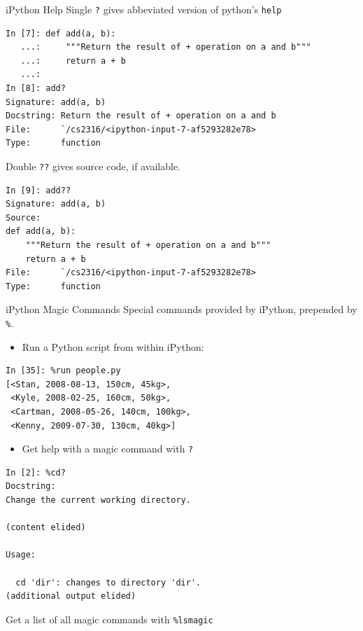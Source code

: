 \documentclass[smaller, aspectratio=1610]{beamer}
\begin{document}
\begin{frame}[label={sec:org6ed3069},fragile]{iPython Help}
 Single \texttt{?} gives abbeviated version of python's \texttt{help}

\lstset{language=sh,label= ,caption= ,captionpos=b,numbers=none}
\begin{lstlisting}
In [7]: def add(a, b):
   ...:     """Return the result of + operation on a and b"""
   ...:     return a + b
   ...:
In [8]: add?
Signature: add(a, b)
Docstring: Return the result of + operation on a and b
File:      `/cs2316/<ipython-input-7-af5293282e78>
Type:      function
\end{lstlisting}

Double \texttt{??} gives source code, if available.

\lstset{language=sh,label= ,caption= ,captionpos=b,numbers=none}
\begin{lstlisting}
In [9]: add??
Signature: add(a, b)
Source:
def add(a, b):
    """Return the result of + operation on a and b"""
    return a + b
File:      `/cs2316/<ipython-input-7-af5293282e78>
Type:      function
\end{lstlisting}
\end{frame}

\begin{frame}[label={sec:orgb9a7c50},fragile]{iPython Magic Commands}
 Special commands provided by iPython, prepended by \texttt{\%}.

\begin{itemize}
\item Run a Python script from within iPython:
\end{itemize}
\lstset{language=sh,label= ,caption= ,captionpos=b,numbers=none}
\begin{lstlisting}
In [35]: %run people.py
[<Stan, 2008-08-13, 150cm, 45kg>,
 <Kyle, 2008-02-25, 160cm, 50kg>,
 <Cartman, 2008-05-26, 140cm, 100kg>,
 <Kenny, 2009-07-30, 130cm, 40kg>]
\end{lstlisting}

\begin{itemize}
\item Get help with a magic command with \texttt{?}
\end{itemize}
\lstset{language=sh,label= ,caption= ,captionpos=b,numbers=none}
\begin{lstlisting}
In [2]: %cd?
Docstring:
Change the current working directory.

(content elided)

Usage:

  cd 'dir': changes to directory 'dir'.
(additional output elided)
\end{lstlisting}

Get a list of all magic commands with \texttt{\%lsmagic}
\end{frame}
\end{document}
